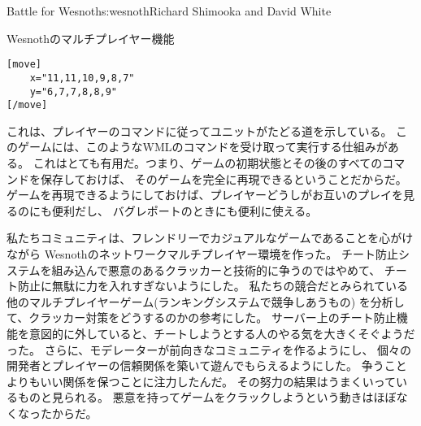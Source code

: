 \begin{aosachapter}{Battle for Wesnoth}{s:wesnoth}{Richard Shimooka and David White}
\begin{aosasect1}{Wesnothのマルチプレイヤー機能}
\begin{verbatim}
[move]
    x="11,11,10,9,8,7"
    y="6,7,7,8,8,9"
[/move]
\end{verbatim}

\noindent
これは、プレイヤーのコマンドに従ってユニットがたどる道を示している。
このゲームには、このようなWMLのコマンドを受け取って実行する仕組みがある。
これはとても有用だ。つまり、ゲームの初期状態とその後のすべてのコマンドを保存しておけば、
そのゲームを完全に再現できるということだからだ。
ゲームを再現できるようにしておけば、プレイヤーどうしがお互いのプレイを見るのにも便利だし、
バグレポートのときにも便利に使える。

私たちコミュニティは、フレンドリーでカジュアルなゲームであることを心がけながら
Wesnothのネットワークマルチプレイヤー環境を作った。
チート防止システムを組み込んで悪意のあるクラッカーと技術的に争うのではやめて、
チート防止に無駄に力を入れすぎないようにした。
私たちの競合だとみられている他のマルチプレイヤーゲーム(ランキングシステムで競争しあうもの)
を分析して、クラッカー対策をどうするのかの参考にした。
サーバー上のチート防止機能を意図的に外していると、チートしようとする人のやる気を大きくそぐようだった。
さらに、モデレーターが前向きなコミュニティを作るようにし、
個々の開発者とプレイヤーの信頼関係を築いて遊んでもらえるようにした。
争うことよりもいい関係を保つことに注力したんだ。
その努力の結果はうまくいっているものと見られる。
悪意を持ってゲームをクラックしようという動きはほぼなくなったからだ。


\end{aosasect1}
\end{aosachapter}
